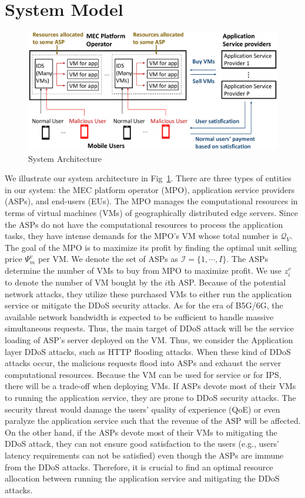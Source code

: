 \documentclass[10pt,journal, compsoc]{IEEEtran}
\begin{document}
\section{System Model}\label{sec:system_model}
\begin{figure}
\centering
\includegraphics[width= 0.7\columnwidth]{5GDDoS_Game_system_architecture.pdf}
\caption{System Architecture}
\label{fig:system}
\end{figure}
We illustrate our system architecture in Fig~\ref{fig:system}. There are three types of entities in our system: the MEC platform operator (MPO), application service providers (ASPs), and end-users (EUs). The MPO manages the computational resources in terms of virtual machines (VMs) of geographically distributed edge servers. Since the ASPs do not have the computational resources to process the application tasks, they have intense demands for the MPO's VM whose total number is $\mathcal{Q}_{V}$. The goal of the MPO is to maximize its profit by finding the optimal unit selling price $\Psi_{m}^v$ per VM. We denote the set of ASPs as $\mathcal{I}=\{1, \cdots, I\}$. The ASPs determine the number of VMs to buy from MPO to maximize profit. We use $z_i^v$ to denote the number of VM bought by the $i$th ASP. Because of the potential network attacks, they utilize these purchased VMs to either run the application service or mitigate the DDoS security attacks. As for the era of B5G/6G, the available network bandwidth is expected to be sufficient to handle massive simultaneous requests. Thus, the main target of DDoS attack will be the service loading of ASP's server deployed on the VM. Thus, we consider the Application layer DDoS attacks, such as HTTP flooding attacks. When these kind of DDoS attacks occur, the malicious requests flood into ASPs and exhaust the server computational resources. Because the VM can be used for service or for IPS, there will be a trade-off when deploying VMs. If ASPs devote most of their VMs to running the application service, they are prone to DDoS security attacks. The security threat would damage the users' quality of experience (QoE) or even paralyze the application service such that the revenue of the ASP will be affected. On the other hand, if the ASPs devote most of their VMs to mitigating the DDoS attack, they can not ensure good satisfaction to the users (e.g., users' latency requirements can not be satisfied) even though the ASPs are immune from the DDoS attacks. Therefore, it is crucial to find an optimal resource allocation between running the application service and mitigating the DDoS attacks. 
\end{document}
